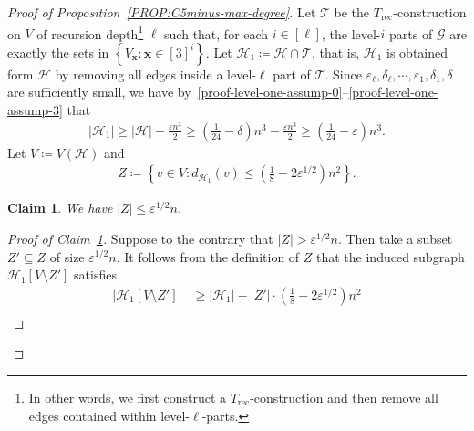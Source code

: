 \documentclass[11pt,a4paper]{article}
\newcommand{\op}[1]{\textcolor{blue}{OP: #1}}
\newtheorem{claim}[definition]{Claim}
\theoremstyle{remark}
\newcommand{\C}[1]{\mathcal{#1}}
\begin{document}
\begin{proof}[Proof of Proposition~\ref{PROP:C5minus-max-degree}]
    Let $\mathcal{T}$ be the $T_{\mathrm{rec}}$-construction on $V$ of recursion depth\footnote{In other words, we first construct a $T_{\mathrm{rec}}$-construction and then remove all edges contained within level-$\ell$-parts.} $\ell$ such that, for each $i \in [\ell]$, the level-$i$ parts of $\mathcal{G}$ are exactly the sets in $\left\{V_{\mathbf{x}} \colon \mathbf{x} \in [3]^{i}\right\}$. Let $\mathcal{H}_1 \coloneqq \mathcal{H} \cap \mathcal{T}$, that is, $\C H_1$ is obtained form $\C H$ by removing all edges inside a level-$\ell$ part of $\C T$.
    Since $\varepsilon_{\ell}, \delta_{\ell},  \cdots,  \varepsilon_1, \delta_1, \delta$ are sufficiently small, we have by~\ref{proof-level-one-assump-0}--\ref{proof-level-one-assump-3} that
    \begin{align}\label{equ:max-degree-H1}
        |\mathcal{H}_1|
        \ge |\mathcal{H}| - \frac{\varepsilon n^3}{2}
        \ge \left(\frac{1}{24}- \delta\right)n^3 - \frac{\varepsilon n^3}{2}
        \ge \left(\frac{1}{24}- \varepsilon\right)n^3. 
    \end{align}
    Let $V \coloneqq V(\mathcal{H})$ and 
    \begin{align*}
        Z 
        \coloneqq \left\{v\in V \colon d_{\mathcal{H}_1}(v) \le \left(\frac{1}{8} - 2\varepsilon^{1/2}\right) n^2\right\}. 
    \end{align*}
    \begin{claim}\label{CLAIM:Z-upper-bound}
        We have $|Z| \le \varepsilon^{1/2} n$. 
    \end{claim}
    \begin{proof}[Proof of Claim~\ref{CLAIM:Z-upper-bound}]
        Suppose to the contrary that $|Z| > \varepsilon^{1/2} n$. Then take a subset $Z' \subseteq Z$ of size $\varepsilon^{1/2} n$. 
        It follows from the definition of $Z$ that the induced subgraph $\mathcal{H}_1[V\setminus Z']$ satisfies 
        \begin{align*}
            |\mathcal{H}_1[V\setminus Z']|
            & \ge |\mathcal{H}_1| - |Z'| \cdot \left(\frac{1}{8} - 2\varepsilon^{1/2}\right) n^2 \\ 

\end{align*}
\end{proof}
\end{proof}
\end{document}
